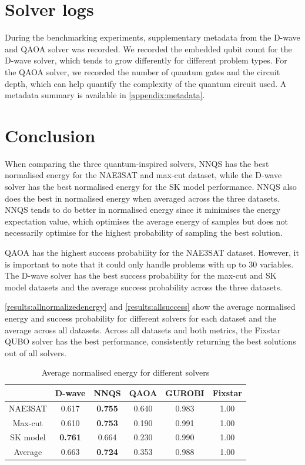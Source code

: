 \section{Solver logs}
During the benchmarking experiments, supplementary metadata from the D-wave and QAOA solver was recorded. We recorded the embedded qubit count for the D-wave solver, which tends to grow differently for different problem types. For the QAOA solver, we recorded the number of quantum gates and the circuit depth, which can help quantify the complexity of the quantum circuit used. A metadata summary is available in \autoref{appendix:metadata}.

\section{Conclusion}
When comparing the three quantum-inspired solvers, NNQS has the best normalised energy for the NAE3SAT and max-cut dataset, while the D-wave solver has the best normalised energy for the SK model performance. NNQS also does the best in normalised energy when averaged across the three datasets. NNQS tends to do better in normalised energy since it minimises the energy expectation value, which optimises the average energy of samples but does not necessarily optimise for the highest probability of sampling the best solution. 

QAOA has the highest success probability for the NAE3SAT dataset. However, it is important to note that it could only handle problems with up to $30$ variables. The D-wave solver has the best success probability for the max-cut and SK model datasets and the average success probability across the three datasets.

\autoref{results:allnormalizedenergy} and \autoref{results:allsuccess} show the average normalised energy and success probability for different solvers for each dataset and the average across all datasets. Across all datasets and both metrics, the Fixstar QUBO solver has the best performance, consistently returning the best solutions out of all solvers.


\begin{table}[!ht]
    \centering
    \begin{tabular}{cccccc} \toprule
        ~ & D-wave & NNQS & QAOA & GUROBI & Fixstar \\ \midrule
        NAE3SAT & 0.617 & \textbf{0.755} & 0.640 & 0.983 & 1.00 \\
        Max-cut & 0.610 & \textbf{0.753} & 0.190 & 0.991 & 1.00 \\
        SK model & \textbf{0.761} & 0.664 & 0.230 & 0.990 & 1.00 \\ \midrule
        Average & 0.663 & \textbf{0.724} & 0.353 & 0.988 & 1.00 \\ \bottomrule
    \end{tabular}
    \caption{Average normalised energy for different solvers}
    \label{results:allnormalizedenergy}
\end{table}

